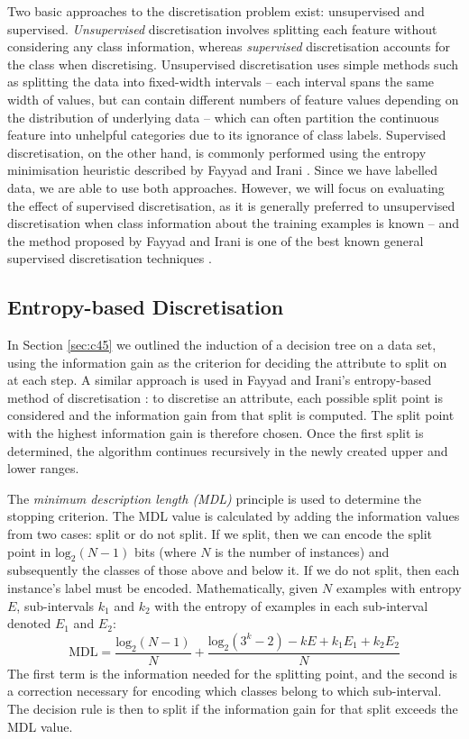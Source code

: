 Two basic approaches to the discretisation problem exist: unsupervised and
supervised. \textit{Unsupervised} discretisation involves splitting each
feature without considering any class information, whereas \textit{supervised}
discretisation accounts for the class when discretising.
Unsupervised discretisation uses simple methods such as splitting the data into
fixed-width intervals -- each interval spans the same width of values,
but can contain different numbers of feature values depending on the
distribution of underlying data -- which
can often partition the continuous feature into unhelpful categories due to its
ignorance of class labels. Supervised discretisation, on the
other hand, is commonly performed using the entropy minimisation heuristic
described by Fayyad and Irani \cite{Fayyad1993}. Since we have labelled
data, we are able to use both approaches. However, we will focus on evaluating
the effect of supervised discretisation, as it is generally preferred to
unsupervised discretisation when class information about the training examples
is known -- and the method proposed by Fayyad and Irani is one of the best
known general supervised discretisation techniques \cite{Witten2005}.

\subsection{Entropy-based Discretisation}
In Section \ref{sec:c45} we outlined the induction of a decision
tree on a data set, using the information gain as the criterion for deciding
the attribute to split on at each step. A similar approach is used in Fayyad
and Irani's entropy-based method of discretisation \cite{Fayyad1993}:
to discretise an attribute,
each possible split point is considered and the information gain from that
split is computed. The split point with the highest information gain is
therefore chosen. Once the first split is determined, the algorithm continues
recursively in the newly created upper and lower ranges.

The \textit{minimum description length (MDL)} principle is used to determine
the stopping criterion. The MDL value is calculated by adding the information
values from two cases: split or do not split. If we split, then we can encode
the split point in $\mathrm{log}_2(N-1)$ bits (where $N$ is the number of
instances) and subsequently the classes of those above and below it. If we do not split,
then each instance's label must be encoded. Mathematically, given $N$ examples
with entropy $E$, sub-intervals $k_1$ and $k_2$ with the entropy of examples
in each sub-interval denoted $E_1$ and $E_2$:
\begin{equation*}
\mathrm{MDL} = \dfrac{\mathrm{log}_2(N-1)}{N} + \dfrac{\mathrm{log}_2(3^k-2) - kE + k_1E_1 + k_2E_2}{N}
\end{equation*}
The first term is the information needed for the splitting point, and the
second is a correction necessary for encoding which classes belong to which
sub-interval. The decision rule is then to split if the information gain for
that split exceeds the MDL value.

